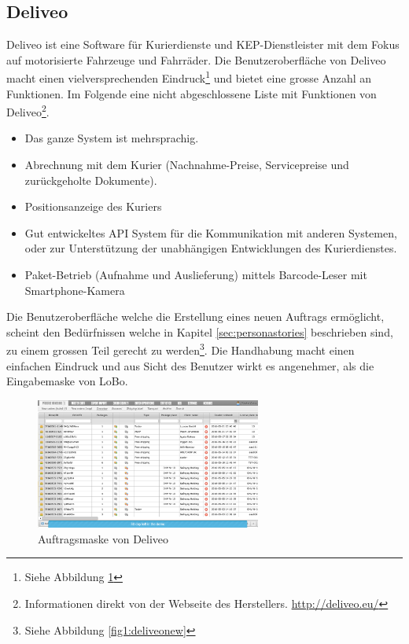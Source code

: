 \subsection{Deliveo}
Deliveo ist eine Software für Kurierdienste und KEP-Dienstleister mit dem Fokus auf motorisierte Fahrzeuge und Fahrräder. Die Benutzeroberfläche von Deliveo macht einen vielversprechenden Eindruck\footnote{ Siehe Abbildung \ref{fig1:deliveomask}} und bietet eine grosse Anzahl an Funktionen. Im Folgende eine nicht abgeschlossene Liste mit Funktionen von Deliveo\footnote{ Informationen direkt von der Webseite des Herstellers. \url{http://deliveo.eu/}}.
\begin{itemize}
	\item Das ganze System ist mehrsprachig.
	\item Abrechnung mit dem Kurier (Nachnahme-Preise, Servicepreise und zurückgeholte Dokumente).
	\item Positionsanzeige des Kuriers
	\item Gut entwickeltes API System für die Kommunikation mit anderen Systemen, oder zur Unterstützung der unabhängigen Entwicklungen des Kurierdienstes.
	\item Paket-Betrieb (Aufnahme und Auslieferung) mittels Barcode-Leser mit Smartphone-Kamera
\end{itemize}
Die Benutzeroberfläche welche die Erstellung eines neuen Auftrags ermöglicht, scheint den Bedürfnissen welche in Kapitel \ref{sec:personastories} beschrieben sind, zu einem grossen Teil gerecht zu werden\footnote{ Siehe Abbildung \ref{fig1:deliveonew}}. Die Handhabung macht einen einfachen Eindruck und aus Sicht des Benutzer wirkt es angenehmer, als die Eingabemaske von LoBo.

\begin{figure}[ht]
	\centering
  \includegraphics[width=0.66\textwidth]{images/deliveo.png}
	\caption{Auftragsmaske von Deliveo}
	\label{fig1:deliveomask}
\end{figure}


